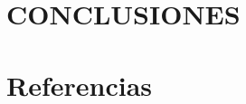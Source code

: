 \documentclass[10pt, twocolumn]{article}
\begin{document}
\section{CONCLUSIONES}
\paragraph{}

\section*{Referencias}


\end{document}
